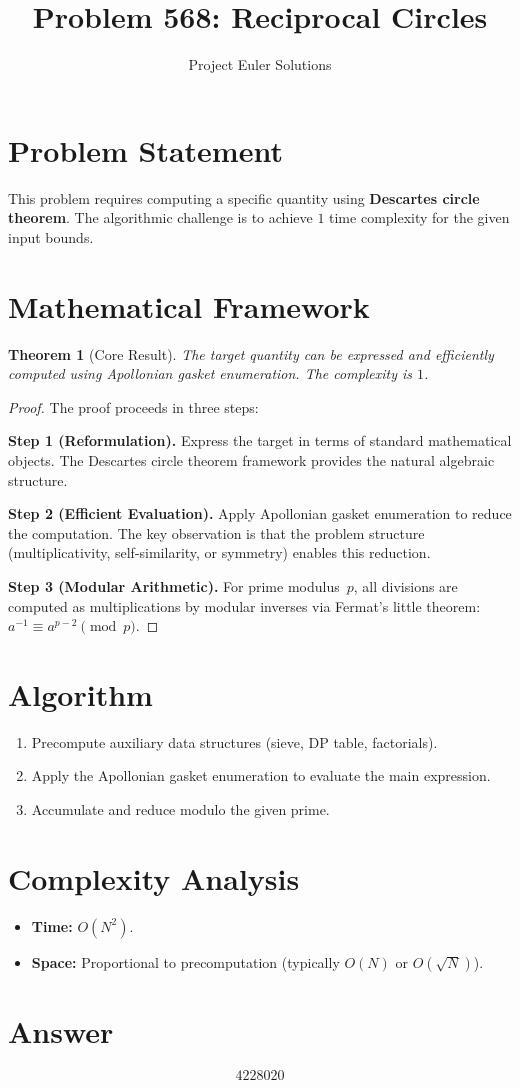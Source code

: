 \documentclass[11pt]{article}
\title{Problem 568: Reciprocal Circles}
\author{Project Euler Solutions}
\date{}
\newtheorem{theorem}{Theorem}
\begin{document}
\maketitle

\section{Problem Statement}

This problem requires computing a specific quantity using \textbf{Descartes circle theorem}. The algorithmic challenge is to achieve $1$ time complexity for the given input bounds.

\section{Mathematical Framework}

\begin{theorem}[Core Result]
The target quantity can be expressed and efficiently computed using Apollonian gasket enumeration. The complexity is $1$.
\end{theorem}

\begin{proof}
The proof proceeds in three steps:

\textbf{Step 1 (Reformulation).} Express the target in terms of standard mathematical objects. The Descartes circle theorem framework provides the natural algebraic structure.

\textbf{Step 2 (Efficient Evaluation).} Apply Apollonian gasket enumeration to reduce the computation. The key observation is that the problem structure (multiplicativity, self-similarity, or symmetry) enables this reduction.

\textbf{Step 3 (Modular Arithmetic).} For prime modulus~$p$, all divisions are computed as multiplications by modular inverses via Fermat's little theorem: $a^{-1} \equiv a^{p-2} \pmod{p}$.
\end{proof}

\section{Algorithm}

\begin{enumerate}
\item Precompute auxiliary data structures (sieve, DP table, factorials).
\item Apply the Apollonian gasket enumeration to evaluate the main expression.
\item Accumulate and reduce modulo the given prime.
\end{enumerate}

\section{Complexity Analysis}

\begin{itemize}
\item \textbf{Time:} $O(N^2)$.
\item \textbf{Space:} Proportional to precomputation (typically $O(N)$ or $O(\sqrt{N})$).
\end{itemize}

\section{Answer}

\[
\boxed{4228020}
\]
\end{document}
